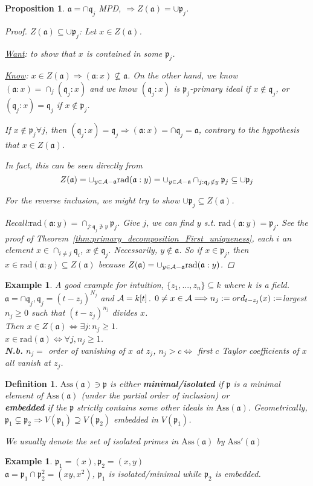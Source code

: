 \documentclass[11pt]{article}
\newtheorem{prop}[thm]{Proposition}
\newtheorem{dfn}[thm]{Definition}
\newtheorem{ex}[thm]{Example}
\newcommand{\sca}{{\mathfrak a}}
\newcommand{\scp}{{\mathfrak p}}
\newcommand{\scq}{\mathfrak q}
\newcommand{\cala}{{\cal A}}
\newcommand{\Lrta}{\Longrightarrow}
\newcommand{\Llrta}{\Longleftrightarrow}
\begin{document}
\begin{prop}
$\sca=\cap\scq_j$ MPD,
$\Lrta Z(\sca)=\cup\scp_j$.
\begin{proof}
$Z(\sca)\subseteq \cup\scp_j$: Let $x\in Z(\sca)$. 

\underline{Want}:  to show that $x$ is contained in some $\scp_j$. 

\underline{Know}: $x\in Z(\sca)\Lrta(\sca:x)\not \subseteq \sca$. On the other hand, we know $(\sca:x)=\cap_j(\scq_j:x)$ and we know $(\scq_j:x)$ is $\scp_j$-primary ideal if $x\notin\scq_j$, or $(\scq_j:x)=\scq_j$ if $x\notin\scp_j$.

If $x\notin\scp_j\forall j$, then $(\scq_j:x)=\scq_j\Lrta (\sca:x)=\cap {\scq_j}=\sca$, contrary to the hypothesis that $x\in Z(\sca)$.

{\color{red} In fact, this can be seen directly from $$Z(\sca)=\cup_{y\in\cala-\sca}\text{rad}(\sca:y)=\cup_{y\in\cala-\sca}\cap_{j:\scq_j\notin y}\scp_j\subseteq\cup \scp_j$$ }

For the reverse inclusion, we might try to show  $\cup\scp_j\subseteq Z(\sca)$.

Recall:$\text{rad}(\sca:y)=\cap_{j:\scq_j\not \ni y}\scp_j$. Give $j$, we can find $y$ s.t. $\text{rad}(\sca:y)=\scp_j$. See the proof of Theorem~\ref{thm:primary_decomposition_First_uniqueness},  each $i$ an element $x\in\cap_{i\neq j}\scq_i$, $x\notin\scq_j$. Necessarily, $y\notin\sca$. So if $x\in \scp_j$, then $x\in  \text{rad}(\sca:y)\subseteq Z(\sca)$ because $Z(\sca)=\cup_{y\in\cala-\sca}\text{rad}(\sca:y)$.
\end{proof}
\end{prop}

\begin{ex}
A good example for intuition, $\{z_1,...,z_n\}\subseteq k$ where $k$ is a field. $\sca=\cap \scq_j, \scq_j=(t-z_j)^{N_j}$ and $\cala=k[t]$.
$0\neq x\in\cala\Lrta n_j:=ord_{t-z_j}(x):=$largest $n_j\geq 0$ such that $(t-z_j)^{n_j}$ divides $x$.\\
Then $x\in Z(\sca)\Llrta \exists j:n_j\geq 1$.\\
$x\in \text{rad}(\sca)\Llrta \forall j, n_j\geq1$.\\
\textbf{N.b.} $n_j=$ order of vanishing of $x $ at $z_j$, $n_j> c\Llrta $ first $c$ Taylor coefficients of $x$ all vanish at $z_j$.
\end{ex}
\begin{dfn}
$\text{Ass}(  \sca)\ni \scp$ is either \textbf{minimal/isolated} if $\scp$ is a minimal element of $\text{Ass}(  \sca)$ (under the partial order of inclusion) or\\
\textbf{embedded} if the $\scp$ strictly contains some other ideals in $\text{Ass}(\sca)$. Geometrically, $\scp_1\subsetneq \scp_2\Lrta V(\scp_1)\supseteq V(\scp_2)$ embedded in $V(\scp_1)$. 

We usually denote the set of isolated primes in $\text{Ass}(  \sca)$ by $\text{Ass}'(\sca)$
\end{dfn}
\begin{ex}
$\scp_1=(x), \scp_2=(x,y)$\\
$\sca=\scp_1\cap\scp_2^2=(xy,x^2)$, $\scp_1$ is isolated/minimal while $\scp_2$ is embedded.
\end{ex}
\end{document}
